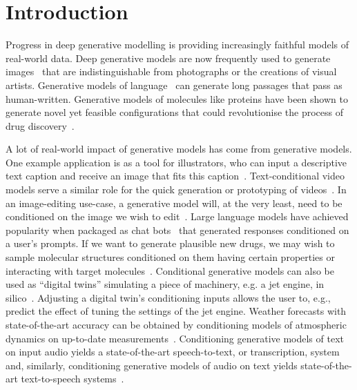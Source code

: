 \chapter{Introduction}
\label{ch:introduction}

Progress in deep generative modelling is providing increasingly faithful models of real-world data. Deep generative models are now frequently used to generate images~\citep{rombach2022high,ho2022imagen} that are indistinguishable from photographs or the creations of visual artists. Generative models of language~\citep{wolf2020transformers} can generate long passages that pass as human-written. Generative models of molecules like proteins have been shown to generate novel yet feasible configurations that could revolutionise the process of drug discovery~\citep{hoogeboom2022equivariant,watson2022broadly}. 

A lot of real-world impact of generative models has come from  generative models. 
One example application is as a tool for illustrators, who can input a descriptive text caption and receive an image that fits this caption~\citep{rombach2022high,ho2022imagen}. Text-conditional video models serve a similar role for the quick generation or prototyping of videos~\citep{ho2022video}. In an image-editing use-case, a generative model will, at the very least, need to be conditioned on the image we wish to edit~\citep{rombach2022high,sheynin2023emu}. Large language models have achieved popularity when packaged as chat bots~\citep{wolf2020transformers} that generated responses conditioned on a user's prompts. If we want to generate plausible new drugs, we may wish to sample molecular structures conditioned on them having certain properties or interacting with target molecules~\citep{watson2022broadly}. Conditional generative models can also be used as ``digital twins'' simulating a piece of machinery, e.g. a jet engine, in silico~\citep{munk2022probabilistic,fuller2020digital}. Adjusting a digital twin's conditioning inputs allows the user to, e.g., predict the effect of tuning the settings of the jet engine. Weather forecasts with state-of-the-art accuracy can be obtained by conditioning models of atmospheric dynamics on up-to-date measurements~\citep{lam2022graphcast}. Conditioning generative models of text on input audio yields a state-of-the-art speech-to-text, or transcription, system~\citep{radford2023robust} and, similarly, conditioning generative models of audio on text yields state-of-the-art text-to-speech systems~\citep{tan2024naturalspeech}.


